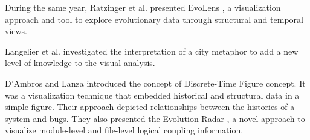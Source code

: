 \bigbreak
During the same year, Ratzinger et al. presented EvoLens \cite{Ratzinger2005}, a visualization approach and tool to 
explore evolutionary data through structural and temporal views.

\bigbreak
Langelier et al. \cite{Langelier2005} investigated the interpretation of a city metaphor 
\cite{Knight2000} to add a new level of knowledge to the visual analysis.
 
\bigbreak
D’Ambros and Lanza \cite{DAmbros2006} introduced the concept of Discrete-Time Figure concept. It was a visualization technique that embedded historical and structural data in a simple figure. 
Their approach depicted relationships between the histories of a system and bugs. 
They also presented the Evolution Radar \cite{DAmbros2006a}, a novel approach to visualize module-level and file-level logical coupling information.


